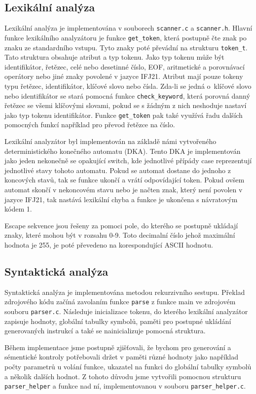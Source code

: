 \documentclass[11pt]{article}
\begin{document}
\subsection{Lexikální analýza}
Lexikální analýza je implementována v souborech \texttt{scanner.c} a \texttt{scanner.h}. Hlavní funkce lexikálního analyzátoru je funkce \texttt{get\_token},
která postupně čte znak po znaku ze standardního vstupu. Tyto znaky poté převádní na strukturu \texttt{token\_t}. Tato struktura obsahuje atribut a typ tokenu.
Jako typ tokenu může být identifikátor, řetězec, celé nebo desetinné číslo, EOF, aritmetické a porovnávací operátory nebo jiné znaky povolené v jazyce IFJ21.
Atribut mají pouze tokeny typu řetězec, identifikátor, klíčové slovo nebo čísla. Zda-li se jedná o~klíčové slovo nebo identifikátor
se stará pomocná funkce \texttt{check\_keyword}, která porovná danný řetězec se všemi klíčovými slovami, pokud se s žádným z nich neshoduje nastaví jako typ
tokenu identifikátor. Funkce \texttt{get\_token} pak také využívá řadu dalších pomocných funkcí například pro převod řetězce na číslo.

Lexikální analyzátor byl implementován na základě námi vytvořeného deterministického konečného automatu (DKA).
Tento DKA je implementován jako jeden nekonečně se opakující switch, kde jednotlivé přípády case reprezentují jednotlivé stavy tohoto automatu.
Pokud se automat dostane do jednoho z koncových stavů, tak se funkce ukončí a vrátí odpovídající token. Pokud ovšem
automat skončí v nekoncovém stavu nebo je načten znak, který není povolen v jazyce IFJ21, tak nastává lexikální chyba a funkce je ukončena s návratovým kódem 1.

Escape sekvence jsou řešeny za pomoci pole, do kterého se postupně ukládají znaky, které mohou být v rozsahu 0-9. Toto decimalní číslo jehož maximální
hodnota je 255, je poté převedeno na korespondující ASCII hodnotu.

\subsection{Syntaktická analýza}
Syntaktická analýza je implementována metodou rekurzivního sestupu. Překlad zdrojového kódu začíná zavolaním funkce
\texttt{parse} z funkce main ve zdrojovém souboru \texttt{parser.c}. Následuje inicializace tokenu, do kterého lexikální analyzátor
zapisuje hodnoty, globální tabulky symbolů, paměti pro postupné ukládání generovaných instrukcí a také se nainicializuje pomocná struktura.

Během implementace jsme postupně zjišťovali,
že bychom pro generování a sémentické kontroly potřebovali držet v paměti různé hodnoty jako například počty parametrů u volání funkce,
ukazatel na funkci do globální tabulky symbolů a několik dalších hodnot. Z tohoto důvodu jsme vytvořili pomocnou strukturu
\texttt{parser\_helper} a funkce nad ní, implementovanou v souboru \texttt{parser\_helper.c}.
\end{document}
